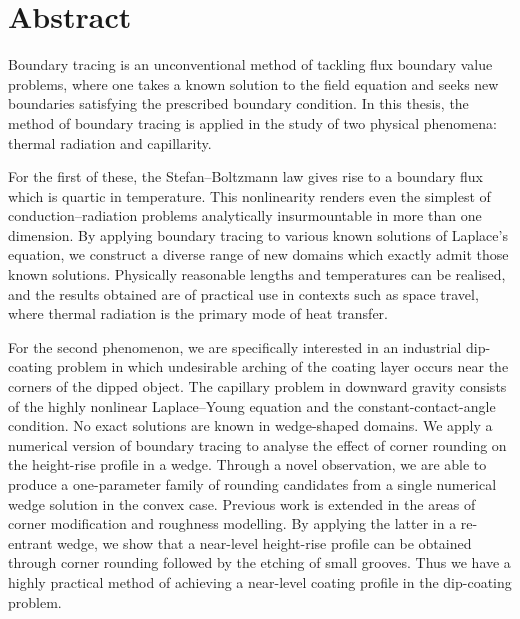 \chapter{Abstract}
\label{ch:abstract}

Boundary tracing is an unconventional method
of tackling flux boundary value problems,
where one takes a known solution to the field equation
and seeks new boundaries satisfying the prescribed boundary condition.
In this thesis, the method of boundary tracing is applied
in the study of two physical phenomena:
thermal radiation and capillarity.

For the first of these,
the Stefan--Boltzmann law gives rise
to a boundary flux which is quartic in temperature.
This nonlinearity renders
even the simplest of conduction--radiation problems
analytically insurmountable in more than one dimension.
By applying boundary tracing to various known solutions of Laplace's equation,
we construct a diverse range of new domains
which exactly admit those known solutions.
Physically reasonable lengths and temperatures can be realised,
and the results obtained are of practical use
in contexts such as space travel,
where thermal radiation is the primary mode of heat transfer.

For the second phenomenon,
we are specifically interested in an industrial dip-coating problem
in which undesirable arching of the coating layer
occurs near the corners of the dipped object.
The capillary problem in downward gravity
consists of the highly nonlinear Laplace--Young equation
and the constant-contact-angle condition.
No exact solutions are known in wedge-shaped domains.
We apply a numerical version of boundary tracing
to analyse the effect of corner rounding
on the height-rise profile in a wedge.
Through a novel observation,
we are able to produce a one-parameter family of rounding candidates
from a single numerical wedge solution in the convex case.
Previous work is extended
in the areas of corner modification and roughness modelling.
By applying the latter in a re-entrant wedge,
we show that a near-level height-rise profile can be obtained
through corner rounding followed by the etching of small grooves.
Thus we have a highly practical method
of achieving a near-level coating profile
in the dip-coating problem.
